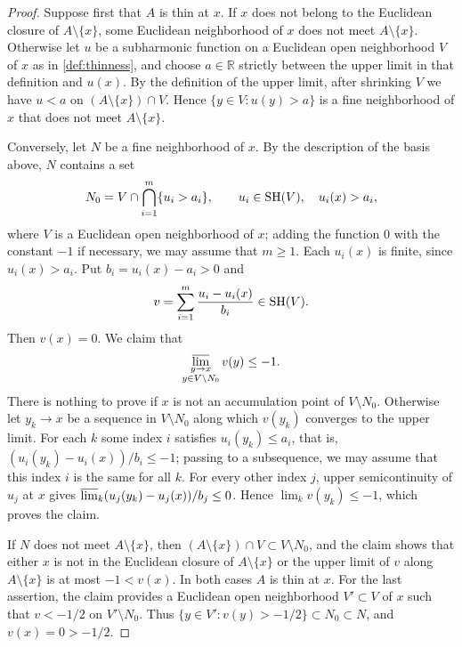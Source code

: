 \begin{proof}
Suppose first that $A$ is thin at $x$. If $x$ does not belong to the Euclidean closure of $A\setminus\{x\}$, some Euclidean neighborhood of $x$ does not meet $A\setminus\{x\}$. Otherwise let $u$ be a subharmonic function on a Euclidean open neighborhood $V$ of $x$ as in \cref{def:thinness}, and choose $a\in\mathbb R$ strictly between the upper limit in that definition and $u(x)$. By the definition of the upper limit, after shrinking $V$ we have $u<a$ on $(A\setminus\{x\})\cap V$. Hence $\{y\in V:u(y)>a\}$ is a fine neighborhood of $x$ that does not meet $A\setminus\{x\}$.

Conversely, let $N$ be a fine neighborhood of $x$. By the description of the basis above, $N$ contains a set
\[
 N_0=V\cap\bigcap_{i=1}^m\{u_i>a_i\},\qquad u_i\in\mathrm{SH}(V),\quad u_i(x)>a_i,
\]
where $V$ is a Euclidean open neighborhood of $x$; adding the function $0$ with the constant $-1$ if necessary, we may assume that $m\geq1$. Each $u_i(x)$ is finite, since $u_i(x)>a_i$. Put $b_i=u_i(x)-a_i>0$ and
\[
 v=\sum_{i=1}^m\frac{u_i-u_i(x)}{b_i}\in\mathrm{SH}(V).
\]
Then $v(x)=0$. We claim that
\[
 \varlimsup_{\substack{y\to x\\y\in V\setminus N_0}}v(y)\leq-1.
\]
There is nothing to prove if $x$ is not an accumulation point of $V\setminus N_0$. Otherwise let $y_k\to x$ be a sequence in $V\setminus N_0$ along which $v(y_k)$ converges to the upper limit. For each $k$ some index $i$ satisfies $u_i(y_k)\leq a_i$, that is, $(u_i(y_k)-u_i(x))/b_i\leq-1$; passing to a subsequence, we may assume that this index $i$ is the same for all $k$. For every other index $j$, upper semicontinuity of $u_j$ at $x$ gives $\varlimsup_k(u_j(y_k)-u_j(x))/b_j\leq0$. Hence $\lim_kv(y_k)\leq-1$, which proves the claim.

If $N$ does not meet $A\setminus\{x\}$, then $(A\setminus\{x\})\cap V\subset V\setminus N_0$, and the claim shows that either $x$ is not in the Euclidean closure of $A\setminus\{x\}$ or the upper limit of $v$ along $A\setminus\{x\}$ is at most $-1<v(x)$. In both cases $A$ is thin at $x$. For the last assertion, the claim provides a Euclidean open neighborhood $V'\subset V$ of $x$ such that $v<-1/2$ on $V'\setminus N_0$. Thus $\{y\in V':v(y)>-1/2\}\subset N_0\subset N$, and $v(x)=0>-1/2$.
\end{proof}

